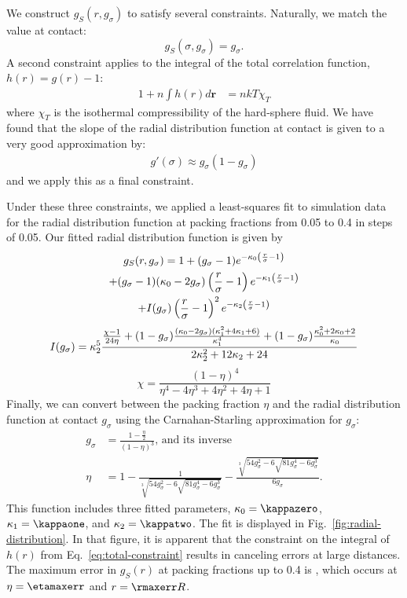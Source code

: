 \documentclass[letterpaper,twocolumn,amsmath,amssymb,pre,aps,10pt]{revtex4-1}
\newcommand{\rr}{\textbf{r}}
\begin{document}
We construct $g_S(r, g_\sigma)$ to satisfy several constraints.
Naturally, we match the value at contact:
\begin{equation}
  g_S(\sigma, g_\sigma) = g_\sigma.
\end{equation}
A second constraint applies to the integral of the total correlation
function, $h(r) = g(r) - 1$:
\begin{align}
  1 + n\int h(r)d\rr &= nkT\chi_T \label{eq:total-constraint}
\end{align}
where $\chi_T$ is the isothermal compressibility of the hard-sphere fluid.
We have found that the slope of the radial distribution function at
contact is given to a very good approximation by:
\begin{align}
  g'(\sigma) \approx g_\sigma (1 - g_\sigma)
\end{align}
and we apply this as a final constraint.\par
Under these three constraints, we applied a least-squares fit to
simulation data for the radial distribution function at packing
fractions from 0.05 to 0.4 in steps of 0.05.  Our fitted radial
distribution function is given by
\begin{multline}
  g_S(r,g_\sigma) = 1 + (g_\sigma-1) e^{-\kappa_0 \left(\frac{r}{\sigma}-1\right)} \\
  + (g_\sigma -1)(\kappa_0 - 2g_\sigma)  \left(\frac{r}{\sigma}-1\right)e^{-\kappa_1  \left(\frac{r}{\sigma}-1\right)} \\
  + I(g_\sigma)  \left(\frac{r}{\sigma}-1\right)^2e^{-\kappa_2  \left(\frac{r}{\sigma}-1\right)}
\end{multline}
\begin{equation}
  I(g_\sigma) = \kappa_2^5 \frac{
    \frac{\chi-1}{24\eta} + (1-g_\sigma) \frac{(\kappa_0-2
      g_\sigma)(\kappa_1^2 + 4 \kappa_1 + 6)}{\kappa_1^4}
    + (1-g_\sigma)\frac{\kappa_0^2 + 2\kappa_0 + 2}{\kappa_0}
  }{2 \kappa_2^2 + 12 \kappa_2 + 24}
\end{equation}
\begin{equation}
  \chi = \frac{(1-\eta)^4}{\eta^4 - 4\eta^3 + 4\eta^2 + 4\eta + 1}
\end{equation}
Finally, we can convert between the packing fraction $\eta$ and the
radial distribution function at contact $g_\sigma$ using the
Carnahan-Starling approximation for $g_\sigma$:
\newcommand\nastyetacuberoot{\sqrt[3]{54 g_\sigma^2 -
    6\sqrt{81g_\sigma^4 - 6g_\sigma^3}}}
\begin{align}
  g_\sigma &= \frac{1-\tfrac{\eta}{2}}{(1-\eta)^3}\text{, and its inverse} \\
  \eta &= 1 - \frac{1}{\nastyetacuberoot} - \frac{\nastyetacuberoot}{6g_\sigma}.
\end{align}
This function includes three fitted parameters, $\kappaO =
\kappazero$, $\kappaI = \kappaone$,
and $\kappaZ = \kappatwo$.
The fit is displayed in Fig.~\ref{fig:radial-distribution}.  In that
figure, it is apparent that the constraint on the integral of $h(r)$ from
Eq.~\ref{eq:total-constraint} results in canceling errors at large
distances.  The maximum error in $g_S(r)$ at packing fractions up to
0.4 is \maxerr, which occurs at $\eta = \etamaxerr$ and $r =
\rmaxerr R$.
\end{document}

